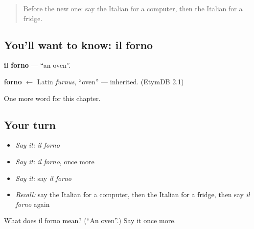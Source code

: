 \begin{quote}
Before the new one: say the Italian for a computer, then the Italian for a fridge.
\end{quote}

\subsection*{You'll want to know: il forno}
\textbf{il forno} — \textquotedblleft{}an oven\textquotedblright{}.

\begin{cousinweb}
\textbf{forno} $\leftarrow$ Latin \emph{furnus}, \textquotedblleft{}oven\textquotedblright{} — inherited. (EtymDB 2.1)
\end{cousinweb}

\begin{grammarlens}[title={What you've built}]
One more word for this chapter.
\end{grammarlens}

\subsection*{Your turn}
\begin{itemize}
\raggedright
  \item \emph{Say it:} \emph{il forno}
  \item \emph{Say it:} \emph{il forno}, once more
  \item \emph{Say it:} say \emph{il forno}
  \item \emph{Recall:} say the Italian for a computer, then the Italian for a fridge, then say \emph{il forno} again
\end{itemize}

\begin{tcolorbox}[breakable,colback=teal!4,colframe=teal!35!black,title={Before you move on}]
What does il forno mean? (\textquotedblleft{}An oven\textquotedblright{}.) Say it once more.
\end{tcolorbox}
